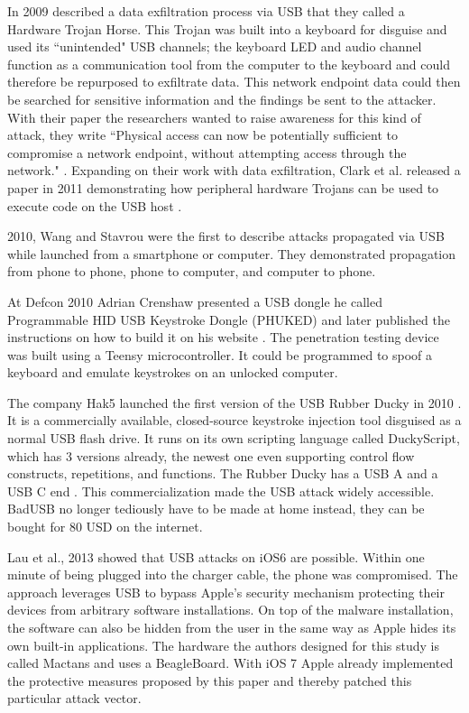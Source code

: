 In 2009 \cite{clarkHardwareTrojanHorse2009} described a data exfiltration process via USB that they called a Hardware Trojan Horse. This Trojan was built into a keyboard for disguise and used its ``unintended" USB channels; the keyboard LED and audio channel function as a communication tool from the computer to the keyboard and could therefore be repurposed to exfiltrate data. This network endpoint data could then be searched for sensitive information and the findings be sent to the attacker. With their paper the researchers wanted to raise awareness for this kind of attack, they write ``Physical access can now be potentially sufficient to compromise a network endpoint, without attempting access through the network." \cite[p.~7]{clarkHardwareTrojanHorse2009}.
Expanding on their work with data exfiltration, Clark et al.\cite{clarkRisksAssociatedUSB2011} released a paper in 2011 demonstrating how peripheral hardware Trojans can be used to execute code on the USB host \cite{clarkRisksAssociatedUSB2011}. 

2010, Wang and Stavrou \cite{wangExploitingSmartphoneUSB2010} were the first to describe attacks propagated via USB while launched from a smartphone or computer. They demonstrated propagation from phone to phone, phone to computer, and computer to phone.

At Defcon 2010 Adrian Crenshaw presented a USB dongle he called Programmable HID USB Keystroke Dongle (PHUKED) and later published the instructions on how to build it on his website \cite{ProgrammableHIDUSB}. The penetration testing device was built using a Teensy microcontroller. It could be programmed to spoof a keyboard and emulate keystrokes on an unlocked computer. 

The company Hak5 launched the first version of the USB Rubber Ducky in 2010 \cite{USBRubberDucky}. It is a commercially available, closed-source keystroke injection tool disguised as a normal USB flash drive. It runs on its own scripting language called DuckyScript, which has 3 versions already, the newest one even supporting control flow constructs, repetitions, and functions. The Rubber Ducky has a USB A and a USB C end \cite{USBRubberDucky2023}. This commercialization made the USB attack widely accessible. BadUSB no longer tediously have to be made at home instead, they can be bought for 80 USD\cite{USBRubberDucky2023} on the internet. 

Lau et al., 2013 \cite{lauMactansInjectingMalware2013} showed that USB attacks on iOS6 are possible. Within one minute of being plugged into the charger cable, the phone was compromised. The approach leverages USB to bypass Apple's security mechanism protecting their devices from arbitrary software installations. On top of the malware installation, the software can also be hidden from the user in the same way as Apple hides its own built-in applications. The hardware the authors designed for this study is called Mactans and uses a BeagleBoard.
With iOS 7 Apple already implemented the protective measures proposed by this paper and thereby patched this particular attack vector. 

